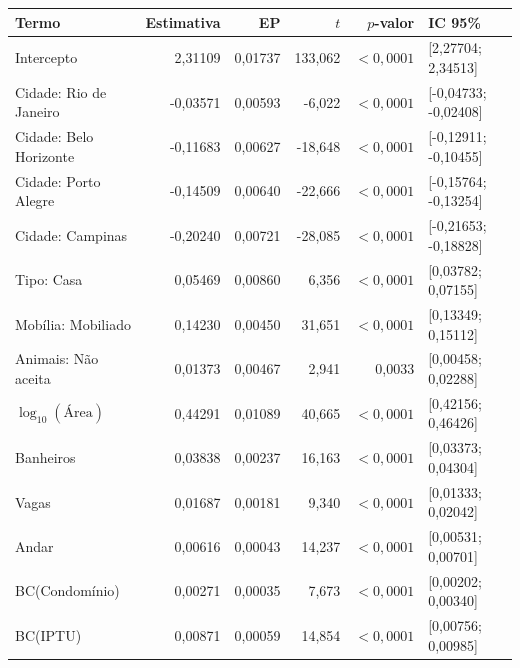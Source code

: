\begin{tabular}{lrrrrl}
\toprule
Termo & Estimativa & EP & $t$ & $p$-valor & IC 95\% \\
\midrule
Intercepto & 2,31109 & 0,01737 & 133,062 & $<0,0001$ & [2,27704; 2,34513] \\
Cidade: Rio de Janeiro & -0,03571 & 0,00593 & -6,022 & $<0,0001$ & [-0,04733; -0,02408] \\
Cidade: Belo Horizonte & -0,11683 & 0,00627 & -18,648 & $<0,0001$ & [-0,12911; -0,10455] \\
Cidade: Porto Alegre & -0,14509 & 0,00640 & -22,666 & $<0,0001$ & [-0,15764; -0,13254] \\
Cidade: Campinas & -0,20240 & 0,00721 & -28,085 & $<0,0001$ & [-0,21653; -0,18828] \\
Tipo: Casa & 0,05469 & 0,00860 & 6,356 & $<0,0001$ & [0,03782; 0,07155] \\
Mobília: Mobiliado & 0,14230 & 0,00450 & 31,651 & $<0,0001$ & [0,13349; 0,15112] \\
Animais: Não aceita & 0,01373 & 0,00467 & 2,941 & 0,0033 & [0,00458; 0,02288] \\
$\log_{10}(\text{Área})$ & 0,44291 & 0,01089 & 40,665 & $<0,0001$ & [0,42156; 0,46426] \\
Banheiros & 0,03838 & 0,00237 & 16,163 & $<0,0001$ & [0,03373; 0,04304] \\
Vagas & 0,01687 & 0,00181 & 9,340 & $<0,0001$ & [0,01333; 0,02042] \\
Andar & 0,00616 & 0,00043 & 14,237 & $<0,0001$ & [0,00531; 0,00701] \\
BC(Condomínio) & 0,00271 & 0,00035 & 7,673 & $<0,0001$ & [0,00202; 0,00340] \\
BC(IPTU) & 0,00871 & 0,00059 & 14,854 & $<0,0001$ & [0,00756; 0,00985] \\
\bottomrule
\end{tabular}
